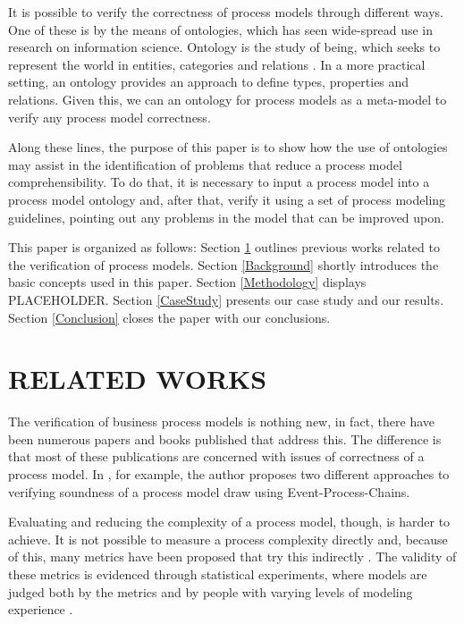 \documentclass[a4paper,twoside]{article}
\begin{document}
It is possible to verify the correctness of process models through different ways. One of these is by the means of ontologies, which has seen wide-spread use in research on information science. Ontology is the study of being, which seeks to represent the world in entities, categories and relations \cite{Mendling2008}. In a more practical setting, an ontology provides an approach to define types, properties and relations. Given this, we can an ontology for process models as a meta-model to verify any process model correctness.


Along these lines, the purpose of this paper is to show how the use of ontologies may assist in the identification of problems that reduce a process model comprehensibility. To do that, it is necessary to input a process model into a process model ontology and, after that, verify it using a set of process modeling guidelines, pointing out any problems in the model that can be improved upon.


This paper is organized as follows: Section \ref{RelatedWorks} outlines previous works related to the verification of process models. Section \ref{Background} shortly introduces the basic concepts used in this paper. Section \ref{Methodology} displays PLACEHOLDER. Section \ref{CaseStudy} presents our case study and our results. Section \ref{Conclusion} closes the paper with our conclusions.

\section{RELATED WORKS}\label{RelatedWorks}


\noindent The verification of business process models is nothing new, in fact, there have been numerous papers and books published that address this. The difference is that most of these publications are concerned with issues of correctness of a process model. In \cite{Mendling2008}, for example, the author proposes two different approaches to verifying soundness of a process model draw using Event-Process-Chains.
	
Evaluating and reducing the complexity of a process model, though, is harder to achieve. It is not possible to measure a process complexity directly and, because of this, many metrics have been proposed that try this indirectly \cite{Quality metrics for business process models} \cite{MetricsForProcessModels} \cite{Complexity metrics for business process models}. The validity of these metrics is evidenced through statistical experiments, where models are judged both by the metrics and by people with varying levels of modeling experience \cite{Process control-flow complexity metric: An empirical validation} \cite{Prediction of business process model quality based on structural metrics}.
\end{document}
